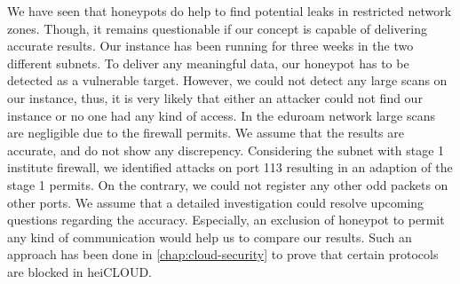 We have seen that honeypots do help to find potential leaks in restricted network zones.
Though, it remains questionable if our concept is capable of delivering accurate results.
Our instance has been running for three weeks in the two different subnets.
To deliver any meaningful data, our honeypot has to be detected as a vulnerable target.
However, we could not detect any large scans on our instance, thus, it is very likely that either an attacker could not find our instance or no one had any kind of access.
In the eduroam network large scans are negligible due to the firewall permits.
We assume that the results are accurate, and do not show any discrepency.
Considering the subnet with stage 1 institute firewall, we identified attacks on port 113 resulting in an adaption of the stage 1 permits.
On the contrary, we could not register any other odd packets on other ports.
We assume that a detailed investigation could resolve upcoming questions regarding the accuracy.
Especially, an exclusion of honeypot to permit any kind of communication would help us to compare our results.
Such an approach has been done in \autoref{chap:cloud-security} to prove that certain protocols are blocked in heiCLOUD.
